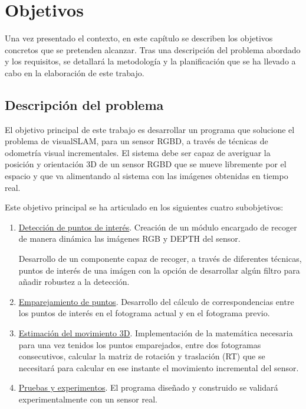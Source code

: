 \chapter{Objetivos}

\label{Chapter2} %

Una vez presentado el contexto, en este capítulo se describen los objetivos concretos que se pretenden alcanzar. Tras una descripción del problema abordado y los requisitos, se detallará la metodología y la planificación que se ha llevado a cabo en la elaboración de este trabajo.

\section{Descripción del problema}

El objetivo principal de este trabajo es desarrollar un programa que solucione el problema de visualSLAM, para un sensor RGBD, a través de técnicas de odometría visual incrementales. El sistema debe ser capaz de averiguar la posición y orientación 3D de un sensor RGBD que se mueve libremente por el espacio y que va alimentando al sistema con las imágenes obtenidas en tiempo real.

Este objetivo principal se ha articulado en los siguientes cuatro subobjetivos:

\begin{enumerate}
 
\item \underline{Detección de puntos de interés}.
Creación de un módulo encargado de recoger de manera dinámica las imágenes RGB y DEPTH del sensor.

Desarrollo de un componente capaz de recoger, a través de diferentes técnicas, puntos de interés de una imágen con la opción de desarrollar algún filtro para añadir robustez a la detección.

\item \underline{Emparejamiento de puntos}.
Desarrollo del cálculo de correspondencias entre los puntos de interés en el fotograma actual y en el fotograma previo.

\item \underline{Estimación del movimiento 3D}.
Implementación de la matemática necesaria para una vez tenidos los puntos emparejados, entre dos fotogramas consecutivos, calcular la matriz de rotación y traslación (RT) que se necesitará para calcular en ese instante el movimiento incremental del sensor.

\item \underline{Pruebas y experimentos}.
El programa diseñado y construido se validará experimentalmente con un sensor real.

\end{enumerate}

